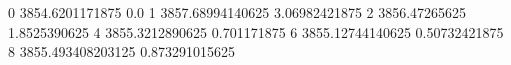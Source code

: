 0 3854.6201171875 0.0
1 3857.68994140625 3.06982421875
2 3856.47265625 1.8525390625
4 3855.3212890625 0.701171875
6 3855.12744140625 0.50732421875
8 3855.493408203125 0.873291015625
